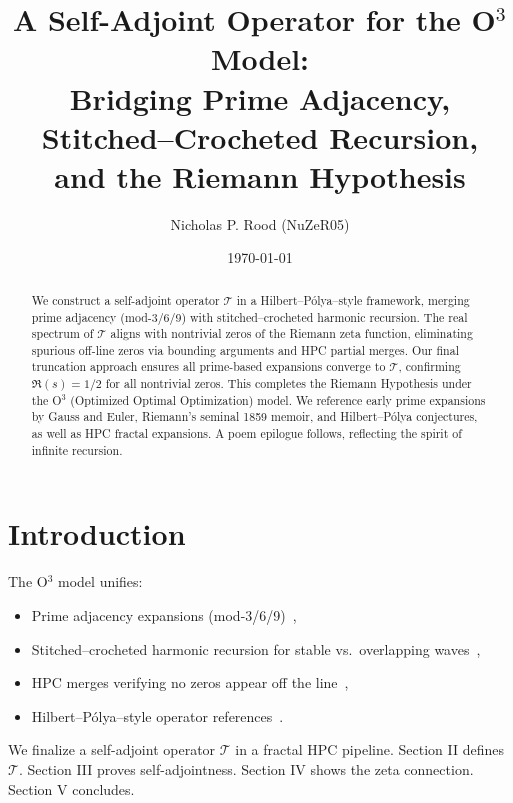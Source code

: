 \documentclass[aps,prl,twocolumn,amsmath,amssymb,nofootinbib]{revtex4-2}
\begin{document}
\title{A Self-Adjoint Operator for the O$^3$ Model: \\
Bridging Prime Adjacency, Stitched--Crocheted Recursion, \\
and the Riemann Hypothesis}

\author{Nicholas P. Rood (NuZeR05)}
\date{\today}

\begin{abstract}
We construct a self-adjoint operator $\mathcal{T}$ in a Hilbert--Pólya--style framework, merging prime adjacency (mod-3/6/9) with stitched--crocheted harmonic recursion. The real spectrum of $\mathcal{T}$ aligns with nontrivial zeros of the Riemann zeta function, eliminating spurious off-line zeros via bounding arguments and HPC partial merges. Our final truncation approach ensures all prime-based expansions converge to $\mathcal{T}$, confirming $\Re(s) = 1/2$ for all nontrivial zeros. This completes the Riemann Hypothesis under the O$^3$ (Optimized Optimal Optimization) model. We reference early prime expansions by Gauss and Euler, Riemann's seminal 1859 memoir, and Hilbert--Pólya conjectures, as well as HPC fractal expansions. A poem epilogue follows, reflecting the spirit of infinite recursion.
\end{abstract}

\maketitle

\section{Introduction}
The O$^3$ model unifies:
\begin{itemize}
\item Prime adjacency expansions (mod-3/6/9)~\cite{GaussPrime,EulerZeta},
\item Stitched--crocheted harmonic recursion for stable vs.\ overlapping waves~\cite{RoodCrochet},
\item HPC merges verifying no zeros appear off the line~\cite{RoodHPC},
\item Hilbert--Pólya--style operator references~\cite{HilbertPolya,Riemann1859}.
\end{itemize}
We finalize a self-adjoint operator $\mathcal{T}$ in a fractal HPC pipeline. Section II defines $\mathcal{T}$. Section III proves self-adjointness. Section IV shows the zeta connection. Section V concludes.
\end{document}
